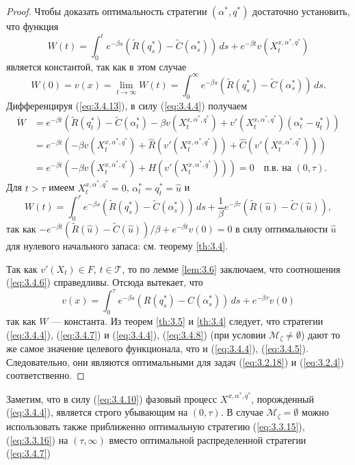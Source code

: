 \begin{proof}
Чтобы доказать оптимальность стратегии $(\alpha^*,q^*)$ достаточно установить, что функция
\begin{equation} \label{eq:3.4.13}
W(t)=\int_0^t e^{-\beta s}(\widetilde R(q_s^*)-\widetilde C(\alpha_s^*))\,ds+e^{-\beta t} v(X_t^{x,\alpha^*,q^*})
\end{equation}
является константой, так как в этом случае
$$ W(0)=v(x)=\lim_{t\to\infty}W(t)=\int_0^\infty e^{-\beta s}(\widetilde R(q_s^*)-\widetilde C(\alpha_s^*))\,ds.$$
Дифференцируя (\ref{eq:3.4.13}), в силу (\ref{eq:3.4.4}) получаем
\begin{align*}
\dot W &=e^{-\beta t}\left(\widetilde R(q_t^*)-\widetilde C(\alpha_t^*)-\beta v(X_t^{x,\alpha^*,q^*})+v'(X_t^{x,\alpha^*, q^*})(\alpha_t^*- q_t^*)\right)\\
 &=e^{-\beta t}\left(-\beta v(X_t^{x,\alpha^*,q^*})+\widehat R(v'(X_t^{x,\alpha^*, q^*}))+\widehat C(v'(X_t^{x,\alpha^*, q^*}))\right)\\
 &=e^{-\beta t}\left(-\beta v(X_t^{x,\alpha^*,q^*})+H(v'(X_t^{x,\alpha^*,q^*}))\right)=0\quad \textrm{п.в. на } (0,\tau).
\end{align*}
Для $t>\tau$ имеем $X_t^{x,\alpha^*,q^*}=0$, $\alpha^*_t=q^*_t=\widehat u$ и
$$ W(t)=\int_0^\tau e^{-\beta s}(\widetilde R(q_s^*)-\widetilde C(\alpha_s^*))\,ds+\frac{1}{\beta}e^{-\beta\tau}(\widetilde R(\widehat u)-\widetilde C(\widehat u)),$$
так как $-e^{-\beta t}(\widetilde R(\widehat u)-\widetilde C(\widehat u))/\beta+e^{-\beta t}v(0)=0$ в силу оптимальности  $\widehat u$ для нулевого начального запаса: см. теорему \ref{th:3.4}.

Так как $v'(X_t)\in F$, $t\in\mathscr T$, то по лемме \ref{lem:3.6} заключаем, что соотношения (\ref{eq:3.4.6}) справедливы. Отсюда вытекает, что
$$ v(x)=\int_0^\tau e^{-\beta s}(R(q_s^*)-C(\alpha_s^*))\,ds+e^{-\beta \tau} v(0)$$
так как $W$ --- константа. Из теорем \ref{th:3.5} и \ref{th:3.4} следует, что стратегии (\ref{eq:3.4.4}), (\ref{eq:3.4.7}) и (\ref{eq:3.4.4}), (\ref{eq:3.4.8}) (при условии $\mathscr M_\zeta\neq \emptyset$) дают то же самое значение целевого функционала, что и (\ref{eq:3.4.4}), (\ref{eq:3.4.5}). Следовательно, они являются оптимальными для задач (\ref{eq:3.2.18}) и (\ref{eq:3.2.4}) соответственно.
\end{proof}

Заметим, что в силу (\ref{eq:3.4.10}) фазовый процесс $X^{x,\alpha^*,q^*}$, порожденный (\ref{eq:3.4.4}), является строго убывающим на $(0,\tau)$.
В случае $\mathscr M_\zeta=\emptyset$ можно использовать также приближенно оптимальную стратегию (\ref{eq:3.3.15}), (\ref{eq:3.3.16}) на $(\tau,\infty)$ вместо оптимальной распределенной стратегии (\ref{eq:3.4.7})

